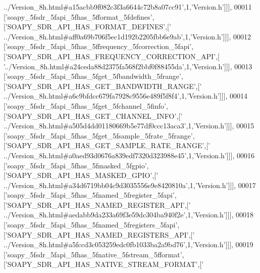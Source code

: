 \begin{DoxyCode}
{      ../Version\_8h.html#a15acbb9f082c3f3a6644c72b8a07cc91'},1,\textcolor{stringliteral}{'Version.h'}]]],
00011   [\textcolor{stringliteral}{'soapy\_5fsdr\_5fapi\_5fhas\_5fformat\_5fdefines'},[\textcolor{stringliteral}{'SOAPY\_SDR\_API\_HAS\_FORMAT\_DEFINES'},[\textcolor{stringliteral}{'
      ../Version\_8h.html#aff0a69b706f5ec1d192b2205fbb6e9ab'},1,\textcolor{stringliteral}{'Version.h'}]]],
00012   [\textcolor{stringliteral}{'soapy\_5fsdr\_5fapi\_5fhas\_5ffrequency\_5fcorrection\_5fapi'},[\textcolor{stringliteral}{'SOAPY\_SDR\_API\_HAS\_FREQUENCY\_CORRECTION\_API'},[\textcolor{stringliteral}{
      '../Version\_8h.html#a24ceda88d2375fa568f2bbf0f88455da'},1,\textcolor{stringliteral}{'Version.h'}]]],
00013   [\textcolor{stringliteral}{'soapy\_5fsdr\_5fapi\_5fhas\_5fget\_5fbandwidth\_5frange'},[\textcolor{stringliteral}{'SOAPY\_SDR\_API\_HAS\_GET\_BANDWIDTH\_RANGE'},[\textcolor{stringliteral}{'
      ../Version\_8h.html#a6c9bfdcc679fa7928c9556e489f5f8f4'},1,\textcolor{stringliteral}{'Version.h'}]]],
00014   [\textcolor{stringliteral}{'soapy\_5fsdr\_5fapi\_5fhas\_5fget\_5fchannel\_5finfo'},[\textcolor{stringliteral}{'SOAPY\_SDR\_API\_HAS\_GET\_CHANNEL\_INFO'},[\textcolor{stringliteral}{'
      ../Version\_8h.html#a505d4dd01180669b5e77df0ccc13aca3'},1,\textcolor{stringliteral}{'Version.h'}]]],
00015   [\textcolor{stringliteral}{'soapy\_5fsdr\_5fapi\_5fhas\_5fget\_5fsample\_5frate\_5frange'},[\textcolor{stringliteral}{'SOAPY\_SDR\_API\_HAS\_GET\_SAMPLE\_RATE\_RANGE'},[\textcolor{stringliteral}{'
      ../Version\_8h.html#a0aed93d0676a839edf7320d323988e45'},1,\textcolor{stringliteral}{'Version.h'}]]],
00016   [\textcolor{stringliteral}{'soapy\_5fsdr\_5fapi\_5fhas\_5fmasked\_5fgpio'},[\textcolor{stringliteral}{'SOAPY\_SDR\_API\_HAS\_MASKED\_GPIO'},[\textcolor{stringliteral}{'
      ../Version\_8h.html#a34d6719bb04c9d3035556e9e8420810a'},1,\textcolor{stringliteral}{'Version.h'}]]],
00017   [\textcolor{stringliteral}{'soapy\_5fsdr\_5fapi\_5fhas\_5fnamed\_5fregister\_5fapi'},[\textcolor{stringliteral}{'SOAPY\_SDR\_API\_HAS\_NAMED\_REGISTER\_API'},[\textcolor{stringliteral}{'
      ../Version\_8h.html#aedabb9da233a69f3e59dc304ba940f2e'},1,\textcolor{stringliteral}{'Version.h'}]]],
00018   [\textcolor{stringliteral}{'soapy\_5fsdr\_5fapi\_5fhas\_5fnamed\_5fregisters\_5fapi'},[\textcolor{stringliteral}{'SOAPY\_SDR\_API\_HAS\_NAMED\_REGISTERS\_API'},[\textcolor{stringliteral}{'
      ../Version\_8h.html#a5fccd3c053259edc0fb1033ba2a9bd76'},1,\textcolor{stringliteral}{'Version.h'}]]],
00019   [\textcolor{stringliteral}{'soapy\_5fsdr\_5fapi\_5fhas\_5fnative\_5fstream\_5fformat'},[\textcolor{stringliteral}{'SOAPY\_SDR\_API\_HAS\_NATIVE\_STREAM\_FORMAT'},[\textcolor{stringliteral}{'
}
\end{DoxyCode}

